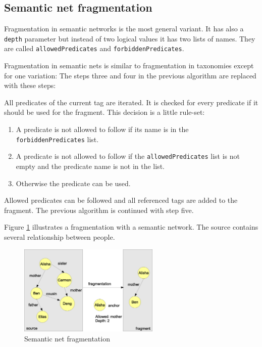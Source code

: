\subsection{Semantic net fragmentation}
Fragmentation in semantic networks is the most general variant. It has also a {\tt depth} parameter but instead of two logical values it has two lists of names. They are called {\tt allowedPredicates} and {\tt forbiddenPredicates}.

Fragmentation in semantic nets is similar to fragmentation in taxonomies except for one variation: The steps three and four in the previous algorithm are replaced with these steps:

All predicates of the current tag are iterated. It is checked for every predicate if it should be used for the fragment. This decision is a little rule-set:

\begin{enumerate}
    \item A predicate is not allowed to follow if its name is in the {\tt forbiddenPredicates} list.

    \item A predicate is not allowed to follow if the {\tt allowedPredicates} list is not empty and the predicate name is not in the list.

\item
Otherwise the predicate can be used.
\end{enumerate}

Allowed predicates can be followed and all referenced tags are added to the fragment. The previous algorithm is continued with step five.

Figure \ref{fig:semanticNetFragmentation} illustrates a fragmentation with a semantic network. The source contains several relationship between people.

\begin{figure}[t]
\centering
\includegraphics[width=0.60\textwidth]{semanticNetFragmentation.eps}
\caption{Semantic net fragmentation}
\label{fig:semanticNetFragmentation}
\end{figure}

